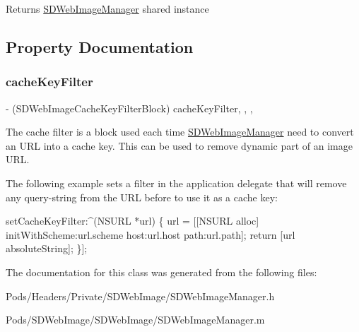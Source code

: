 \begin{DoxyReturn}{Returns}
\mbox{\hyperlink{interface_s_d_web_image_manager}{S\+D\+Web\+Image\+Manager}} shared instance 
\end{DoxyReturn}


\subsection{Property Documentation}
\mbox{\label{interface_s_d_web_image_manager_aa95a2fbd9decbe956b7b088075856010}} 
\subsubsection{\texorpdfstring{cache\+Key\+Filter}{cacheKeyFilter}}
{\footnotesize\ttfamily -\/ (S\+D\+Web\+Image\+Cache\+Key\+Filter\+Block) cache\+Key\+Filter\hspace{0.3cm}{\ttfamily [read]}, {\ttfamily [write]}, {\ttfamily [nonatomic]}, {\ttfamily [copy]}}

The cache filter is a block used each time \mbox{\hyperlink{interface_s_d_web_image_manager}{S\+D\+Web\+Image\+Manager}} need to convert an U\+RL into a cache key. This can be used to remove dynamic part of an image U\+RL.

The following example sets a filter in the application delegate that will remove any query-\/string from the U\+RL before to use it as a cache key\+:


\begin{DoxyCode}
[[\mbox{\hyperlink{interface_s_d_web_image_manager}{SDWebImageManager}} \mbox{\hyperlink{interface_s_d_web_image_manager_a03e60850e7f6da2aa38b7db870c93626}{sharedManager}}] setCacheKeyFilter:^(NSURL *url) \{
    url = [[NSURL alloc] initWithScheme:url.scheme host:url.host path:url.path];
    \textcolor{keywordflow}{return} [url absoluteString];
\}];
\end{DoxyCode}
 

The documentation for this class was generated from the following files\+:\begin{DoxyCompactItemize}
\item 
Pods/\+Headers/\+Private/\+S\+D\+Web\+Image/S\+D\+Web\+Image\+Manager.\+h\item 
Pods/\+S\+D\+Web\+Image/\+S\+D\+Web\+Image/S\+D\+Web\+Image\+Manager.\+m\end{DoxyCompactItemize}
